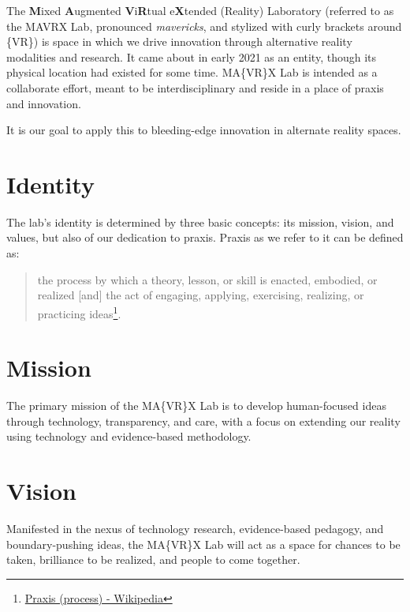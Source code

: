 \documentclass[]{tufte-book}
\begin{document}
The \textbf{M}ixed \textbf{A}ugmented \textbf{V}i\textbf{R}tual e\textbf{X}tended (Reality) Laboratory (referred to as the MAVRX Lab, pronounced \emph{mavericks}, and stylized with curly brackets around \{VR\}) is space in which we drive innovation through alternative reality modalities and research. It came about in early 2021 as an entity, though its physical location had existed for some time. MA\{VR\}X Lab is intended as a collaborate effort, meant to be interdisciplinary and reside in a place of praxis and innovation.

It is our goal to apply this to bleeding-edge innovation in alternate reality spaces.

\hypertarget{identity}{%
\section*{Identity}\label{identity}}

The lab's identity is determined by three basic concepts: its mission, vision, and values, but also of our dedication to praxis. Praxis as we refer to it can be defined as:

\begin{quote}
the process by which a theory, lesson, or skill is enacted, embodied, or realized {[}and{]} the act of engaging, applying, exercising, realizing, or practicing ideas\footnote{\href{https://en.wikipedia.org/wiki/Praxis_(process)}{Praxis (process) - Wikipedia}}.
\end{quote}

\hypertarget{mission}{%
\section*{Mission}\label{mission}}

The primary mission of the MA\{VR\}X Lab is to develop human-focused ideas through technology, transparency, and care, with a focus on extending our reality using technology and evidence-based methodology.

\hypertarget{vision}{%
\section*{Vision}\label{vision}}

Manifested in the nexus of technology research, evidence-based pedagogy, and boundary-pushing ideas, the MA\{VR\}X Lab will act as a space for chances to be taken, brilliance to be realized, and people to come together.
\end{document}
